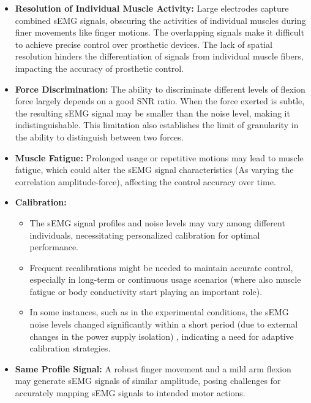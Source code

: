 \documentclass[conference]{IEEEtran}
\begin{document}
\begin{itemize}
   \item \textbf{Resolution of Individual Muscle Activity:} 
   Large electrodes capture combined sEMG signals, obscuring the 
   activities of individual muscles during finer movements like finger motions. 
   The overlapping signals make it difficult to achieve precise control 
   over prosthetic devices. The lack of spatial resolution hinders the 
   differentiation of signals from individual muscle fibers, impacting 
   the accuracy of prosthetic control.


   \item \textbf{Force Discrimination:}
   The ability to discriminate different levels of flexion force largely 
   depends on a good SNR ratio. When the force exerted is subtle, 
   the resulting sEMG signal may be smaller than the noise level, making it 
   indistinguishable. This limitation also establishes the limit of granularity in the ability
   to distinguish between two forces.
   
   
   \item \textbf{Muscle Fatigue:} 
   Prolonged usage or repetitive motions may lead to muscle fatigue, 
   which could alter the sEMG signal characteristics (As varying the correlation amplitude-force), 
   affecting the control accuracy over time.
   
   \item \textbf{Calibration:}
   \begin{itemize}
       \item The sEMG signal profiles and noise levels may vary among 
       different individuals, necessitating personalized calibration for 
       optimal performance.
       \item Frequent recalibrations might be needed to maintain accurate 
       control, especially in long-term or continuous usage scenarios 
       (where also muscle fatigue or body conductivity start playing an important role).
       \item In some instances, such as in the experimental conditions, the sEMG noise levels 
       changed significantly within a short period (due to external changes in the power supply isolation)
       , indicating a need for adaptive calibration strategies.
   \end{itemize}
   
   \item \textbf{Same Profile Signal:} 
   A robust finger movement and a mild arm flexion may generate sEMG 
   signals of similar amplitude, posing challenges for accurately mapping 
   sEMG signals to intended motor actions.
\end{itemize}
\end{document}
